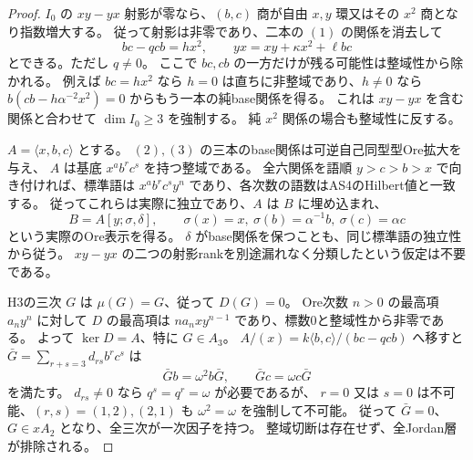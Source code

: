 \begin{proof}
$I_0$ の $xy-yx$ 射影が零なら、$(b,c)$ 商が自由 $x,y$ 環又はその $x^2$ 商となり指数増大する。
従って射影は非零であり、二本の $(1)$ の関係を消去して
\[
 bc-qcb=h x^2,\qquad yx=xy+\kappa x^2+\ell bc
\tag{3}
\]
とできる。ただし $q\ne0$。
ここで $bc,cb$ の一方だけが残る可能性は整域性から除かれる。
例えば $bc=h x^2$ なら $h=0$ は直ちに非整域であり、$h\ne0$ なら
$b(cb-h\alpha^{-2}x^2)=0$ からもう一本の純base関係を得る。
これは $xy-yx$ を含む関係と合わせて $\dim I_0\ge3$ を強制する。
純 $x^2$ 関係の場合も整域性に反する。

$A=\langle x,b,c\rangle$ とする。
$(2),(3)$ の三本のbase関係は可逆自己同型型Ore拡大を与え、
$A$ は基底 $x^a b^r c^s$ を持つ整域である。
全六関係を語順 $y>c>b>x$ で向き付ければ、標準語は
$x^a b^r c^s y^n$ であり、各次数の語数はAS4のHilbert値と一致する。
従ってこれらは実際に独立であり、$A$ は $B$ に埋め込まれ、
\[
 B=A[y;\sigma,\delta],\qquad
 \sigma(x)=x,\ \sigma(b)=\alpha^{-1}b,\ \sigma(c)=\alpha c
\]
という実際のOre表示を得る。
$\delta$ がbase関係を保つことも、同じ標準語の独立性から従う。
$xy-yx$ の二つの射影rankを別途漏れなく分類したという仮定は不要である。

H3の三次 $G$ は $\mu(G)=G$、従って $D(G)=0$。
Ore次数 $n>0$ の最高項 $a_n y^n$ に対して $D$ の最高項は
$n a_n x y^{n-1}$ であり、標数0と整域性から非零である。
よって $\ker D=A$、特に $G\in A_3$。
$A/(x)=k\langle b,c\rangle/(bc-qcb)$ へ移すと
$\bar G=\sum_{r+s=3}d_{rs}b^r c^s$ は
\[
 \bar G b=\omega^2 b\bar G,\qquad
 \bar G c=\omega c\bar G
\]
を満たす。
$d_{rs}\ne0$ なら $q^s=q^r=\omega$ が必要であるが、
$r=0$ 又は $s=0$ は不可能、$(r,s)=(1,2),(2,1)$ も $\omega^2=\omega$ を強制して不可能。
従って $\bar G=0$、$G\in xA_2$ となり、全三次が一次因子を持つ。
整域切断は存在せず、全Jordan層が排除される。
\end{proof}
